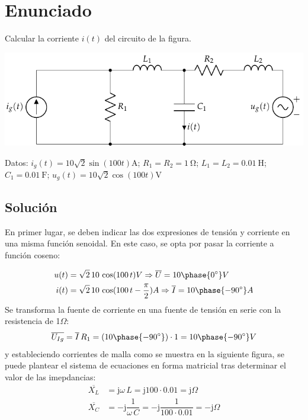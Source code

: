 \section{Enunciado}

Calcular la corriente $i(t)$ del circuito de la figura.

\begin{center}
  \includegraphics{figuras/BT2_13.pdf}
\end{center}
Datos: $i_g(t) = 10\sqrt{2}\sin(100t)\unit{\ampere}$; $R_1 = R_2 = \qty{1}{\ohm}$; $L_1 = L_2 = \qty{0.01}{\henry}$; $C_1 = \qty{0.01}{\farad}$; $u_g(t) = 10\sqrt{2}\cos(100t)\unit{\volt}$
\subsection*{Solución}

En primer lugar, se deben indicar las dos expresiones de tensión y
corriente en una misma función senoidal. En este caso, se opta por
pasar la corriente a función coseno:

\begin{align*}
  u(t)&=\sqrt{2}\,10\,\cos(100\,t) V\Rightarrow \overline{U}=10\phase{\ang{0}} V\\
  i(t)&=\sqrt{2}\,10\,\cos(100\,t-\frac{\pi}{2}) A\Rightarrow \overline{I}=10\phase{\ang{-90}} A
\end{align*}
Se transforma la fuente de corriente en una fuente de tensión en serie
con la resistencia de 1$\Omega$:
\begin{equation*}
  \overline{U_{Ig}}=\overline{I}\, R_{1}=(10\phase{\ang{-90}})\cdot 1=10\phase{\ang{-90}} V
\end{equation*}
y estableciendo corrientes de malla como se muestra en la siguiente
figura, se puede plantear el sistema de ecuaciones en forma matricial
tras determinar el valor de las imepdancias:
\begin{align*}
  \overline{X_L}&=\mathrm{j}\omega\,L=\mathrm{j} 100\cdot 0.01= \mathrm{j}\Omega\\
  \overline{X_C}&=-\mathrm{j}\dfrac{1}{\omega\,C}=-\mathrm{j} \dfrac{1}{100\cdot 0.01}= -\mathrm{j}\Omega
\end{align*}

